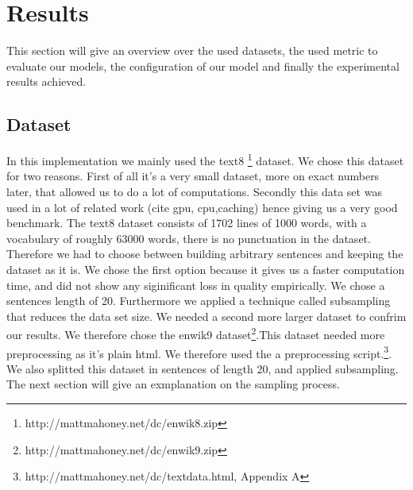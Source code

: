 
\chapter{Results}\label{chap:results}



This section will give an overview over the used datasets, the used metric to evaluate our models, the configuration of our model and finally the experimental results achieved.

\section{Dataset}\label{sec:dataset}
In this implementation we mainly used the text8 \footnote{http://mattmahoney.net/dc/enwik8.zip} dataset. We chose this dataset for two reasons. First of all it's a very small dataset, more on exact numbers later, that allowed us to do a lot of computations. Secondly this data set was used in a lot of related work (cite gpu, cpu,caching) hence giving us a very good benchmark. The text8 dataset consists of 1702 lines of 1000 words, with a vocabulary of roughly 63000 words, there is no punctuation in the dataset. Therefore we had to choose between building arbitrary sentences and keeping the dataset as it is. We chose the first option because it gives us a faster computation time, and did not show any siginificant loss in quality empirically. We chose a sentences length of 20. Furthermore we applied a technique called subsampling that reduces the data set size. 
We needed a second more larger dataset to confrim our results.  We therefore chose the enwik9 dataset\footnote{http://mattmahoney.net/dc/enwik9.zip}.This dataset needed more preprocessing as it's plain html. We therefore used the a preprocessing script.\footnote{http://mattmahoney.net/dc/textdata.html, Appendix A}. We also splitted this dataset in sentences of length 20, and applied subsampling. The next section will give an exmplanation on the sampling process.
 
 
